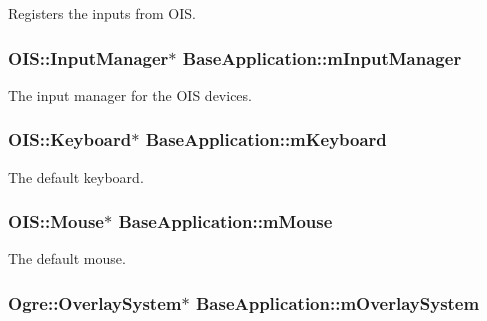 \-Registers the inputs from \-O\-I\-S. \hypertarget{classBaseApplication_abc9503c8462e225b5d0d55c952d9e4a9}{
\subsubsection[{m\-Input\-Manager}]{\setlength{\rightskip}{0pt plus 5cm}\-O\-I\-S\-::\-Input\-Manager$\ast$ {\bf \-Base\-Application\-::m\-Input\-Manager}}}\label{classBaseApplication_abc9503c8462e225b5d0d55c952d9e4a9}
\-The input manager for the \-O\-I\-S devices. \hypertarget{classBaseApplication_a9d6e19cf50c47379fbaae55bff28079c}{
\subsubsection[{m\-Keyboard}]{\setlength{\rightskip}{0pt plus 5cm}\-O\-I\-S\-::\-Keyboard$\ast$ {\bf \-Base\-Application\-::m\-Keyboard}}}\label{classBaseApplication_a9d6e19cf50c47379fbaae55bff28079c}
\-The default keyboard. \hypertarget{classBaseApplication_add9b97fbe64da2814d3af113bac58c43}{
\subsubsection[{m\-Mouse}]{\setlength{\rightskip}{0pt plus 5cm}\-O\-I\-S\-::\-Mouse$\ast$ {\bf \-Base\-Application\-::m\-Mouse}}}\label{classBaseApplication_add9b97fbe64da2814d3af113bac58c43}
\-The default mouse. \hypertarget{classBaseApplication_a17ccdacc654eff8ac0d09f025311fbb5}{
\subsubsection[{m\-Overlay\-System}]{\setlength{\rightskip}{0pt plus 5cm}\-Ogre\-::\-Overlay\-System$\ast$ {\bf \-Base\-Application\-::m\-Overlay\-System}}}\label{classBaseApplication_a17ccdacc654eff8ac0d09f025311fbb5}
